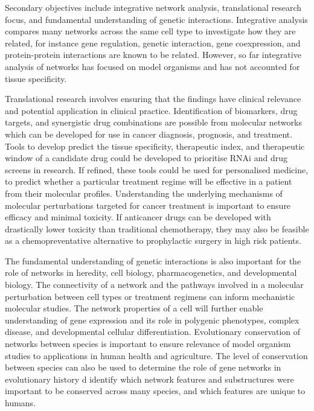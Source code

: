 Secondary objectives include integrative network analysis, translational research focus, and fundamental understanding of genetic interactions. Integrative analysis compares many networks across the same cell type to investigate how they are related, for instance gene regulation, genetic interaction, gene coexpression, and protein-protein interactions are known to be related. However, so far integrative analysis of networks has focused on model organisms and has not accounted for tissue specificity.

Translational research involves ensuring that the findings have clinical relevance and potential application in clinical practice. Identification of biomarkers, drug targets, and synergistic drug combinations are possible from molecular networks which can be developed for use in cancer diagnosis, prognosis, and treatment. Tools to develop predict the tissue specificity, therapeutic index, and therapeutic window of a candidate drug could be developed to prioritise \gls{RNAi} and drug screens in research. If refined, these tools could be used for personalised medicine, to predict whether a particular treatment regime will be effective in a patient from their molecular profiles. Understanding the underlying mechanisms of molecular perturbations targeted for cancer treatment is important to ensure efficacy and minimal toxicity. If anticancer drugs can be developed with drastically lower toxicity than traditional chemotherapy, they may also be feasible as a chemopreventative alternative to prophylactic surgery in high risk patients.

The fundamental understanding of genetic interactions is also important for the role of networks in heredity, cell biology, pharmacogenetics, and developmental biology. The connectivity of a network and the pathways involved in a molecular perturbation between cell types or treatment regimens can inform mechanistic molecular studies. The network properties of a cell will further enable understanding of gene expression and its role in polygenic phenotypes, complex disease, and developmental cellular differentiation. Evolutionary conservation of networks between species is important to ensure relevance of model organism studies to applications in human health and agriculture. The level of conservation between species can also be used to determine the role of gene networks in evolutionary history d identify which network features and substructures were important to be conserved across many species, and which features are unique to humans.

